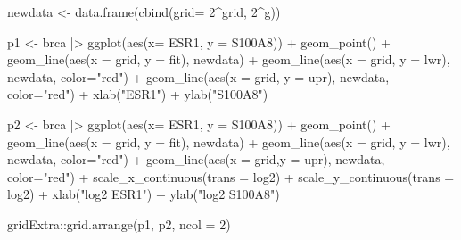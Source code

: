 \documentclass[
  dutch,
  letterpaper,
  12pt]{book}
\newenvironment{Shaded}{\begin{snugshade}}{\end{snugshade}}
\newcommand{\AttributeTok}[1]{\textcolor[rgb]{0.40,0.45,0.13}{#1}}
\newcommand{\DecValTok}[1]{\textcolor[rgb]{0.68,0.00,0.00}{#1}}
\newcommand{\FunctionTok}[1]{\textcolor[rgb]{0.28,0.35,0.67}{#1}}
\newcommand{\NormalTok}[1]{\textcolor[rgb]{0.00,0.23,0.31}{#1}}
\newcommand{\OtherTok}[1]{\textcolor[rgb]{0.00,0.23,0.31}{#1}}
\newcommand{\SpecialCharTok}[1]{\textcolor[rgb]{0.37,0.37,0.37}{#1}}
\newcommand{\StringTok}[1]{\textcolor[rgb]{0.13,0.47,0.30}{#1}}
\theoremstyle{definition}
\theoremstyle{definition}
\theoremstyle{definition}
\theoremstyle{remark}
\begin{document}
\begin{Shaded}
\begin{Highlighting}[]
\NormalTok{newdata }\OtherTok{\textless{}{-}} \FunctionTok{data.frame}\NormalTok{(}\FunctionTok{cbind}\NormalTok{(}\AttributeTok{grid=} \DecValTok{2}\SpecialCharTok{\^{}}\NormalTok{grid, }\DecValTok{2}\SpecialCharTok{\^{}}\NormalTok{g))}

\NormalTok{p1 }\OtherTok{\textless{}{-}}\NormalTok{ brca }\SpecialCharTok{|\textgreater{}} \FunctionTok{ggplot}\NormalTok{(}\FunctionTok{aes}\NormalTok{(}\AttributeTok{x=}\NormalTok{ ESR1, }\AttributeTok{y =}\NormalTok{ S100A8)) }\SpecialCharTok{+}
  \FunctionTok{geom\_point}\NormalTok{() }\SpecialCharTok{+}
  \FunctionTok{geom\_line}\NormalTok{(}\FunctionTok{aes}\NormalTok{(}\AttributeTok{x =}\NormalTok{ grid, }\AttributeTok{y =}\NormalTok{ fit), newdata) }\SpecialCharTok{+}
  \FunctionTok{geom\_line}\NormalTok{(}\FunctionTok{aes}\NormalTok{(}\AttributeTok{x =}\NormalTok{ grid, }\AttributeTok{y =}\NormalTok{ lwr), newdata, }\AttributeTok{color=}\StringTok{"red"}\NormalTok{) }\SpecialCharTok{+}
  \FunctionTok{geom\_line}\NormalTok{(}\FunctionTok{aes}\NormalTok{(}\AttributeTok{x =}\NormalTok{ grid, }\AttributeTok{y =}\NormalTok{ upr), newdata, }\AttributeTok{color=}\StringTok{"red"}\NormalTok{) }\SpecialCharTok{+}
  \FunctionTok{xlab}\NormalTok{(}\StringTok{"ESR1"}\NormalTok{) }\SpecialCharTok{+}
  \FunctionTok{ylab}\NormalTok{(}\StringTok{"S100A8"}\NormalTok{)}

\NormalTok{p2 }\OtherTok{\textless{}{-}}\NormalTok{ brca }\SpecialCharTok{|\textgreater{}} \FunctionTok{ggplot}\NormalTok{(}\FunctionTok{aes}\NormalTok{(}\AttributeTok{x=}\NormalTok{ ESR1, }\AttributeTok{y =}\NormalTok{ S100A8)) }\SpecialCharTok{+}
  \FunctionTok{geom\_point}\NormalTok{() }\SpecialCharTok{+}
  \FunctionTok{geom\_line}\NormalTok{(}\FunctionTok{aes}\NormalTok{(}\AttributeTok{x =}\NormalTok{ grid, }\AttributeTok{y =}\NormalTok{ fit), newdata) }\SpecialCharTok{+}
  \FunctionTok{geom\_line}\NormalTok{(}\FunctionTok{aes}\NormalTok{(}\AttributeTok{x =}\NormalTok{ grid, }\AttributeTok{y =}\NormalTok{ lwr), newdata, }\AttributeTok{color=}\StringTok{"red"}\NormalTok{) }\SpecialCharTok{+}
  \FunctionTok{geom\_line}\NormalTok{(}\FunctionTok{aes}\NormalTok{(}\AttributeTok{x =}\NormalTok{ grid,}\AttributeTok{y =}\NormalTok{ upr), newdata, }\AttributeTok{color=}\StringTok{"red"}\NormalTok{)  }\SpecialCharTok{+}
  \FunctionTok{scale\_x\_continuous}\NormalTok{(}\AttributeTok{trans =} \StringTok{\textquotesingle{}log2\textquotesingle{}}\NormalTok{) }\SpecialCharTok{+}
  \FunctionTok{scale\_y\_continuous}\NormalTok{(}\AttributeTok{trans =} \StringTok{\textquotesingle{}log2\textquotesingle{}}\NormalTok{) }\SpecialCharTok{+}
  \FunctionTok{xlab}\NormalTok{(}\StringTok{"log2 ESR1"}\NormalTok{) }\SpecialCharTok{+}
  \FunctionTok{ylab}\NormalTok{(}\StringTok{"log2 S100A8"}\NormalTok{)}

\NormalTok{gridExtra}\SpecialCharTok{::}\FunctionTok{grid.arrange}\NormalTok{(p1, p2, }\AttributeTok{ncol =} \DecValTok{2}\NormalTok{)}
\end{Highlighting}
\end{Shaded}
\end{document}
